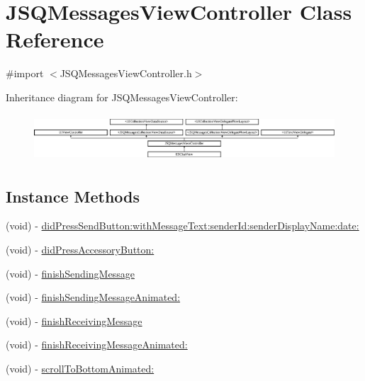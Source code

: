 \hypertarget{interface_j_s_q_messages_view_controller}{}\section{J\+S\+Q\+Messages\+View\+Controller Class Reference}
\label{interface_j_s_q_messages_view_controller}


{\ttfamily \#import $<$J\+S\+Q\+Messages\+View\+Controller.\+h$>$}

Inheritance diagram for J\+S\+Q\+Messages\+View\+Controller\+:\begin{figure}[H]
\begin{center}
\leavevmode
\includegraphics[height=1.777778cm]{interface_j_s_q_messages_view_controller}
\end{center}
\end{figure}
\subsection*{Instance Methods}
\begin{DoxyCompactItemize}
\item 
(void) -\/ \hyperlink{interface_j_s_q_messages_view_controller_a1ce21634ac1d71de98e329646cb0faa4}{did\+Press\+Send\+Button\+:with\+Message\+Text\+:sender\+Id\+:sender\+Display\+Name\+:date\+:}
\item 
(void) -\/ \hyperlink{interface_j_s_q_messages_view_controller_a40c1228bd394c9917f1fc132d87f00d0}{did\+Press\+Accessory\+Button\+:}
\item 
(void) -\/ \hyperlink{interface_j_s_q_messages_view_controller_a09ca5ccbf378e5845ff06b92b1584cbb}{finish\+Sending\+Message}
\item 
(void) -\/ \hyperlink{interface_j_s_q_messages_view_controller_ae388c190ff18c23156048bdc0b04be81}{finish\+Sending\+Message\+Animated\+:}
\item 
(void) -\/ \hyperlink{interface_j_s_q_messages_view_controller_a00f52e97b18f06276be2bbdc284ccc41}{finish\+Receiving\+Message}
\item 
(void) -\/ \hyperlink{interface_j_s_q_messages_view_controller_a3dff4f268a5c1b89dbeb79e123a997bf}{finish\+Receiving\+Message\+Animated\+:}
\item 
(void) -\/ \hyperlink{interface_j_s_q_messages_view_controller_ab9827df42e5c49ab99f169d2c2f3838b}{scroll\+To\+Bottom\+Animated\+:}
\end{DoxyCompactItemize}
